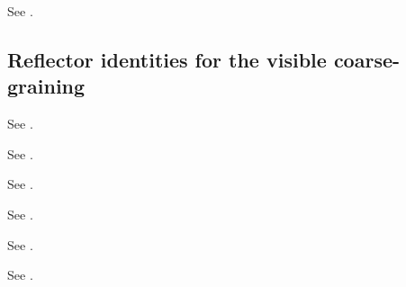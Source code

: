 \begin{theorem}
\label{thm:smith-denominator}
See \cite[Theorem~\textup{``Smith-normal-form denominator formula''}]{MaZhangProjectionCore2026}.
\end{theorem}

\subsection{Reflector identities for the visible coarse-graining}

\begin{definition}
\label{def:visible-divergence}
See \cite[Definition~\textup{``Visible divergence and visible metric''}]{MaZhangProjectionCore2026}.
\end{definition}

\begin{proposition}
\label{prop:visible-contraction}
See \cite[Proposition~\textup{``Visible contraction''}]{MaZhangProjectionCore2026}.
\end{proposition}

\begin{theorem}
\label{thm:entropy-identity}
See \cite[Theorem~\textup{``Fiberwise entropy decomposition''}]{MaZhangProjectionCore2026}.
\end{theorem}

\begin{corollary}
\label{cor:max-entropy-visible}
See \cite[Corollary~\textup{``Maximum entropy on a visible fiber''}]{MaZhangProjectionCore2026}.
\end{corollary}

\begin{theorem}
\label{thm:kl-pythagorean}
See \cite[Theorem~\textup{``Fiberwise KL decomposition''}]{MaZhangProjectionCore2026}.
\end{theorem}

\begin{corollary}
\label{cor:i-projection}
See \cite[Corollary~\textup{``Information projection onto the visible model''}]{MaZhangProjectionCore2026}.
\end{corollary}
